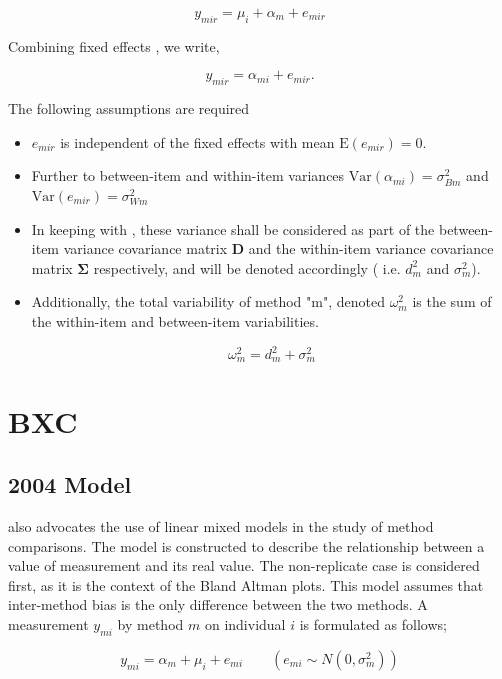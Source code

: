 \documentclass[12pt, a4paper]{report}
\theoremstyle{plain}
\theoremstyle{definition}
\theoremstyle{remark}
\begin{document}
	\[ y_{mir} = \mu_{i} + \alpha_{m} + e_{mir}  \]
	
	Combining fixed effects \citep{barnhart}, we write,
	
	\[ y_{mir} = \alpha_{mi} + e_{mir}.\]
	
	The following assumptions are required
	
	\begin{itemize}
		\item $e_{mir}$ is independent of the fixed effects with mean $\mbox{E}(e_{mir}) = 0$.
		\item Further to \citet{barnhart} between-item and within-item variances $\mbox{Var}(\alpha_{mi}) = \sigma^2_{Bm}$ and $\mbox{Var}(e_{mir}) = \sigma^2_{Wm}$
		\item In keeping with \citet{ARoy2009}, these variance shall be considered as part of the between-item variance covariance matrix $\boldsymbol{D}$ and the within-item variance covariance matrix  $\boldsymbol{\Sigma}$
		respectively, and will be denoted accordingly ( i.e. $d^2_{m}$ and $\sigma^2_{m}$).
		\item Additionally, the total variability of method "m", denoted $\omega^2_m$ is the sum of the within-item and between-item variabilities.
		
		\[ \omega^2_m = d^2_{m}+ \sigma^2_{m} \]
		
	\end{itemize}
	\newpage
	
	
	\chapter{BXC}	
	\section{2004 Model}
	\cite{BXC2004} also advocates the use of linear mixed models in the study of method comparisons. 
	The model is constructed to describe the relationship between a value of measurement and its
	real value.
	The non-replicate case is considered first, as it is the context of the Bland Altman plots. This model assumes that
	inter-method bias is the only difference between the two methods. A measurement $y_{mi}$ by method $m$ on individual $i$ is
	formulated as follows;
	
	\begin{equation}
	y_{mi}  = \alpha_{m} + \mu_{i} + e_{mi} \qquad ( e_{mi} \sim
	N(0,\sigma^{2}_{m}))
	\end{equation}
	
\end{document}
